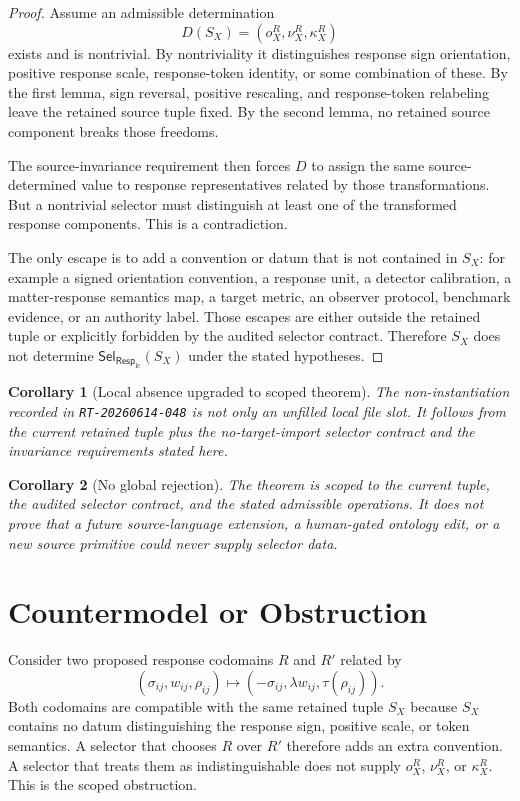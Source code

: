 \documentclass[11pt]{article}
\newcommand{\RespLC}{\mathsf{Resp}_{\mathrm{lc}}}
\newcommand{\SelResp}{\mathsf{Sel}_{\RespLC}}
\newtheorem{corollary}{Corollary}
\begin{document}
\begin{proof}
Assume an admissible determination
\[
    D(S_X)=(o^R_X,\nu^R_X,\kappa^R_X)
\]
exists and is nontrivial. By nontriviality it distinguishes response
sign orientation, positive response scale, response-token identity, or
some combination of these. By the first lemma, sign reversal,
positive rescaling, and response-token relabeling leave the retained
source tuple fixed. By the second lemma, no retained source component
breaks those freedoms.

The source-invariance requirement then forces \(D\) to assign the same
source-determined value to response representatives related by those
transformations. But a nontrivial selector must distinguish at least
one of the transformed response components. This is a contradiction.

The only escape is to add a convention or datum that is not contained
in \(S_X\): for example a signed orientation convention, a response
unit, a detector calibration, a matter-response semantics map, a
target metric, an observer protocol, benchmark evidence, or an
authority label. Those escapes are either outside the retained tuple
or explicitly forbidden by the audited selector contract. Therefore
\(S_X\) does not determine \(\SelResp(S_X)\) under the stated
hypotheses.
\end{proof}

\begin{corollary}[Local absence upgraded to scoped theorem]
The non-instantiation recorded in \texttt{RT-20260614-048} is not only
an unfilled local file slot. It follows from the current retained
tuple plus the no-target-import selector contract and the invariance
requirements stated here.
\end{corollary}

\begin{corollary}[No global rejection]
The theorem is scoped to the current tuple, the audited selector
contract, and the stated admissible operations. It does not prove that
a future source-language extension, a human-gated ontology edit, or a
new source primitive could never supply selector data.
\end{corollary}

\section{Countermodel or Obstruction}

Consider two proposed response codomains \(R\) and \(R'\) related by
\[
    (\sigma_{ij},w_{ij},\rho_{ij})
    \mapsto
    (-\sigma_{ij},\lambda w_{ij},\tau(\rho_{ij})).
\]
Both codomains are compatible with the same retained tuple \(S_X\)
because \(S_X\) contains no datum distinguishing the response sign,
positive scale, or token semantics. A selector that chooses \(R\) over
\(R'\) therefore adds an extra convention. A selector that treats them
as indistinguishable does not supply \(o^R_X\), \(\nu^R_X\), or
\(\kappa^R_X\). This is the scoped obstruction.
\end{document}
